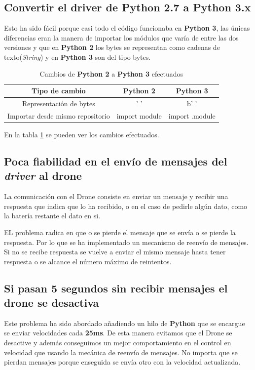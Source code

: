 \subsection{Convertir el \textbf{driver} de Python 2.7 a Python 3.x}
Esto ha sido fácil porque casi todo el código funcionaba en\textbf{ Python 3}, las únicas diferencias eran la manera de importar los módulos que varía de entre las dos versiones y que en \textbf{Python 2} los bytes se representan como cadenas de texto(\textit{String}) y en \textbf{Python 3} son del tipo bytes.
\begin{table}[H]
\centering
\label{cambios_python_2_3}
\begin{tabular}{|c|c|c|}
\hline
\textbf{Tipo de cambio}          & \textbf{Python 2} & \textbf{Python 3} \\ \hline
Representación de bytes          & ' '               & b' '              \\ \hline
Importar desde mismo repositorio & import module     & import .module    \\ \hline
\end{tabular}
\caption{Cambios de \textbf{Python 2} a \textbf{Python 3} efectuados}
\end{table}

En la tabla \ref{cambios_python_2_3} se pueden ver los cambios efectuados.

\subsection{Poca fiabilidad en el envío de mensajes del \textit{driver} al drone}
La comunicación con el Drone consiste en enviar un mensaje y recibir una respuesta que indica que lo ha recibido, o en el caso de pedirle algún dato, como la batería restante el dato en si.

EL problema radica en que o se pierde el mensaje que se envía o  se pierde la respuesta. Por lo que se ha implementado un mecanismo de reenvío de mensajes. Si no se recibe respuesta se vuelve a enviar el mismo mensaje hasta tener respuesta o se alcance el número máximo de reintentos.

\subsection{Si pasan 5 segundos sin recibir mensajes el drone se desactiva}
Este problema ha sido abordado añadiendo un hilo de \textbf{Python} que se encargue se enviar velocidades cada \textbf{25ms}. De esta manera evitamos que el Drone se desactive y además conseguimos un mejor comportamiento en el control en velocidad que usando la mecánica de reenvío de mensajes. No importa que se pierdan mensajes porque enseguida se envía otro con la velocidad actualizada.

